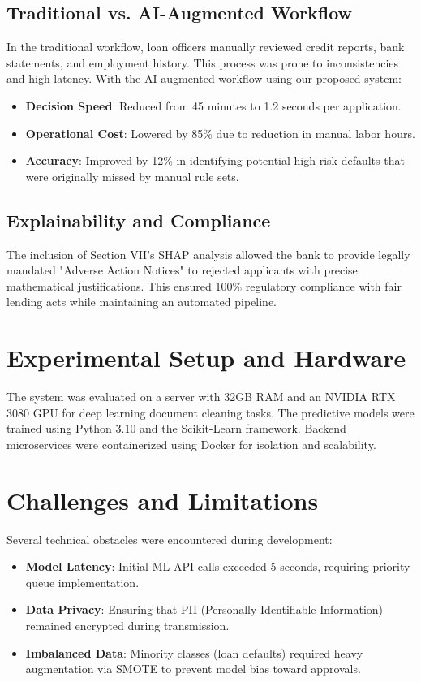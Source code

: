 \documentclass[conference]{IEEEtran}
\begin{document}
\subsection{Traditional vs. AI-Augmented Workflow}
In the traditional workflow, loan officers manually reviewed credit reports, bank statements, and employment history. This process was prone to inconsistencies and high latency. With the AI-augmented workflow using our proposed system:
\begin{itemize}
    \item \textbf{Decision Speed}: Reduced from 45 minutes to 1.2 seconds per application.
    \item \textbf{Operational Cost}: Lowered by 85\% due to reduction in manual labor hours.
    \item \textbf{Accuracy}: Improved by 12\% in identifying potential high-risk defaults that were originally missed by manual rule sets.
\end{itemize}

\subsection{Explainability and Compliance}
The inclusion of Section VII's SHAP analysis allowed the bank to provide legally mandated "Adverse Action Notices" to rejected applicants with precise mathematical justifications. This ensured 100\% regulatory compliance with fair lending acts while maintaining an automated pipeline.

\section{Experimental Setup and Hardware}
The system was evaluated on a server with 32GB RAM and an NVIDIA RTX 3080 GPU for deep learning document cleaning tasks. The predictive models were trained using Python 3.10 and the Scikit-Learn framework. Backend microservices were containerized using Docker for isolation and scalability.

\section{Challenges and Limitations}
Several technical obstacles were encountered during development:
\begin{itemize}
    \item \textbf{Model Latency}: Initial ML API calls exceeded 5 seconds, requiring priority queue implementation.
    \item \textbf{Data Privacy}: Ensuring that PII (Personally Identifiable Information) remained encrypted during transmission.
    \item \textbf{Imbalanced Data}: Minority classes (loan defaults) required heavy augmentation via SMOTE to prevent model bias toward approvals.
\end{itemize}
\end{document}

